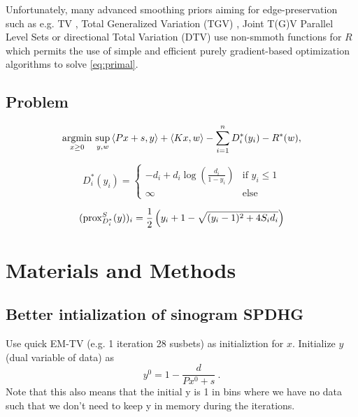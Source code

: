 Unfortunately, many advanced smoothing priors aiming for edge-preservation 
such as e.g. TV \cite{Rudin1992}, Total Generalized Variation (TGV) 
\cite{Bredies2010}, Joint T(G)V \cite{Rigie2015,Knoll2016}
Parallel Level Sets \cite{Ehrhardt2016a,Schramm2017} or directional Total Variation (DTV)
\cite{Ehrhardt2016} use non-smmoth functions for $R$ which permits the use of simple and efficient 
purely gradient-based optimization algorithms to solve \eqref{eq:primal}.

\subsection{Problem}

\begin{equation}
\operatorname*{argmin} _{x\geq 0} \, \sup_{y,w} \,  \langle Px + s, y \rangle + \langle Kx, w \rangle - \sum_{i=1}^{n} D_i^*(y_i) - R^*(w),
\end{equation}

\begin{equation}
D_i^*(y_i) =
\begin{cases}
-d_i + d_i \log \left( \frac{d_i}{1-y_i} \right) & \text{if } y_i \leq 1 \\
\infty & \text{else}
\end{cases}
\end{equation}

\begin{equation}
(\operatorname{prox}_{D_i^*}^{S}(y))_i = \frac{1}{2} \left(y_i + 1 - \sqrt{ (y_i-1)^2 + 4 S_i d_i} \right)
\label{eq:proxD}
\end{equation} 

\section{Materials and Methods}

\subsection{Better intialization of sinogram SPDHG}

Use quick EM-TV (e.g. 1 iteration 28 susbets) as initializtion for $x$.
Initialize $y$ (dual variable of data) as
\begin{equation}
y^0 = 1 - \frac{d}{Px^0 + s} \ .
\end{equation}
Note that this also means that the initial y is 1 in bins where we have
no data such that we don't need to keep y in memory during the iterations.

